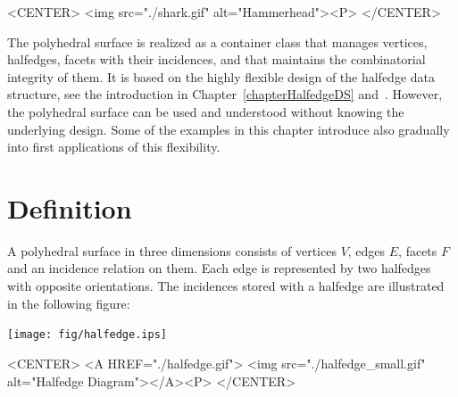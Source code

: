 \begin{ccHtmlOnly}
    <CENTER>
        <img src="./shark.gif" alt="Hammerhead"><P>
    </CENTER>
\end{ccHtmlOnly}

The polyhedral surface is realized as a container class that manages
vertices, halfedges, facets with their incidences, and that maintains
the combinatorial integrity of them. It is based on the highly
flexible design of the halfedge data structure, see the introduction
in Chapter~\ref{chapterHalfedgeDS} and~\cite{k-ugpdd-99}. However, the
polyhedral surface can be used and understood without knowing the
underlying design. Some of the examples in this chapter introduce also
gradually into first applications of this flexibility.

\section{Definition}
  
A polyhedral surface  in
three dimensions consists of vertices $V$, edges $E$, facets $F$ and
an incidence relation on them.  Each edge is represented by two
halfedges with opposite orientations. The incidences stored with a
halfedge are illustrated in the following figure:

\begin{ccTexOnly}
    \vspace{-7mm}
    \begin{center}
      \parbox{0.4\textwidth}{%
          \texttt{[image: fig/halfedge.ips]}%
      }
    \end{center}
    \vspace{-5mm}
\end{ccTexOnly}

\begin{ccHtmlOnly}
    <CENTER>
    <A HREF="./halfedge.gif">
        <img src="./halfedge_small.gif" alt="Halfedge Diagram"></A><P>
    </CENTER>
\end{ccHtmlOnly}

